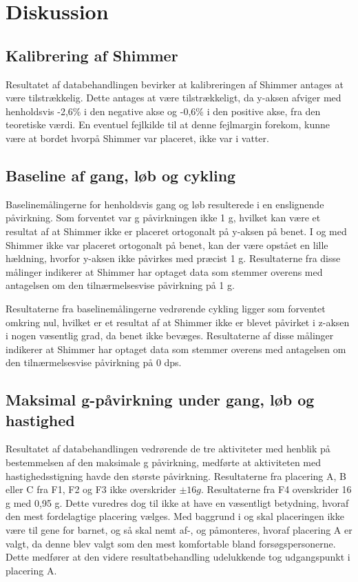 \section{Diskussion}
\subsection{Kalibrering af Shimmer}
Resultatet af databehandlingen bevirker at kalibreringen af Shimmer antages at være tilstrækkelig. Dette antages at være tilstrækkeligt, da y-aksen  afviger med henholdsvis -2,6\% i den negative akse og -0,6\% i den positive akse, fra den teoretiske værdi. En eventuel fejlkilde til at denne fejlmargin forekom, kunne være at bordet hvorpå Shimmer var placeret, ikke var i vatter.

\subsection{Baseline af gang, løb og cykling}
Baselinemålingerne for henholdsvis gang og løb resulterede i en enslignende påvirkning. Som forventet var g påvirkningen ikke 1 g, hvilket kan være et resultat af at Shimmer ikke er placeret ortogonalt på y-aksen på benet. I og med Shimmer ikke var placeret ortogonalt på benet, kan der være opstået en lille hældning, hvorfor y-aksen ikke påvirkes med præcist 1 g. Resultaterne fra disse målinger indikerer at Shimmer har optaget data som stemmer overens med antagelsen om den tilnærmelsesvise påvirkning på 1 g. 

Resultaterne fra baselinemålingerne vedrørende cykling ligger som forventet omkring nul, hvilket er et resultat af at Shimmer ikke er blevet påvirket i z-aksen i nogen væsentlig grad, da benet ikke bevæges. Resultaterne af disse målinger indikerer at Shimmer har optaget data som stemmer overens med antagelsen om den tilnærmelsesvise påvirkning på 0 dps. 

\subsection{Maksimal g-påvirkning under gang, løb og hastighed} \label{app:maxg}
Resultatet af databehandlingen vedrørende de tre aktiviteter med henblik på bestemmelsen af den maksimale g påvirkning, medførte at aktiviteten med hastighedsstigning havde den største påvirkning. Resultaterne fra placering A, B eller C fra F1, F2 og F3 ikke overskrider $\pm 16g$. Resultaterne fra F4 overskrider 16 g med 0,95 g. Dette vuredres dog til ikke at have en væsentligt betydning, hvoraf den mest fordelagtige placering vælges. Med baggrund i  og  skal placeringen ikke være til gene for barnet, og så skal nemt af-, og påmonteres, hvoraf placering A er valgt, da denne blev valgt som den mest komfortable bland forsøgspersonerne. Dette medfører at den videre resultatbehandling udelukkende tog udgangspunkt i placering A. 

